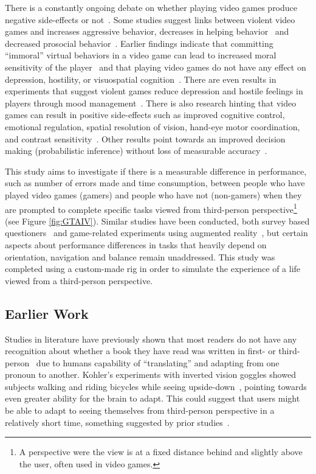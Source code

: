 \documentclass[runningheads,a4paper,oribibl]{llncs}
\begin{document}
There is a constantly ongoing debate on whether playing video games produce negative side-effects or not~\cite{tear2014video}. Some studies suggest links between violent video games and increases aggressive behavior, decreases in helping behavior~\cite{anderson2004update} and decreased prosocial behavior~\cite{anderson2001effects}. Earlier findings indicate that committing ``immoral'' virtual behaviors in a video game can lead to increased moral sensitivity of the player~\cite{grizzard2014being} and that playing video games do not have any effect on depression, hostility, or visuospatial cognition~\cite{valadez2012just}. There are even results in experiments that suggest violent games reduce depression and hostile feelings in players through mood management~\cite{ferguson2015hitman}. There is also research hinting that video games can result in positive side-effects such as improved cognitive control, emotional regulation, spatial resolution of vision, hand-eye motor coordination, and contrast sensitivity~\cite{gong2015enhanced}. Other results point towards an improved decision making (probabilistic inference) without loss of measurable accuracy~\cite{green2010improved}.

This study aims to investigate if there is a measurable difference in performance, such as number of errors made and time consumption, between people who have played video games (gamers) and people who have not (non-gamers) when they are prompted to complete specific tasks viewed from third-person perspective\footnote{A perspective were the view is at a fixed distance behind and slightly above the user, often used in video games.} (see Figure \ref{fig:GTAIV}). Similar studies have been conducted, both survey based questioners~\cite{schmierbach2011exploring} and game-related experiments using augmented reality~\cite{nakamura20103pi}, but certain aspects about performance differences in tasks that heavily depend on orientation, navigation and balance remain unaddressed. This study was completed using a custom-made rig in order to simulate the experience of a life viewed from a third-person perspective.



\subsection{Earlier Work}
Studies in literature have previously shown that most readers do not have any recognition about whether a book they have read was written in first- or third-person~\cite{hagg2012nya} due to humans capability of ``translating'' and adapting from one pronoun to another. Kohler's experiments with inverted vision goggles showed subjects walking and riding bicycles while seeing upside-down~\cite{kohler1962goggles}, pointing towards even greater ability for the brain to adapt. This could suggest that users might be able to adapt to seeing themselves from third-person perspective in a relatively short time, something suggested by prior studies~\cite{nakamura20103pi}.
\end{document}
